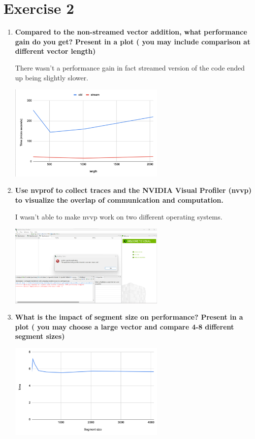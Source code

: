 \documentclass[a4paper,11pt]{scrartcl}
\begin{document}
\section*{Exercise 2}

\begin{enumerate}
  \item \textbf{Compared to the non-streamed vector addition, what performance gain do you get? Present in a plot ( you may include comparison at different vector length)}

  There wasn't a performance gain in fact streamed version of the code ended up being slightly slower.
    
  \includegraphics*[width=0.6\textwidth]{images/stream.png}

  \item \textbf{Use nvprof to collect traces and the NVIDIA Visual Profiler (nvvp) to visualize the overlap of communication and computation.}

  I wasn't able to make nvvp work on two different operating systems.

  \includegraphics*[width=0.6\textwidth]{images/err.png}

  \item \textbf{What is the impact of segment size on performance? Present in a plot ( you may choose a large vector and compare 4-8 different segment sizes)}

  \includegraphics*[width=0.6\textwidth]{images/segmentsize.png}

\end{enumerate}
\end{document}
